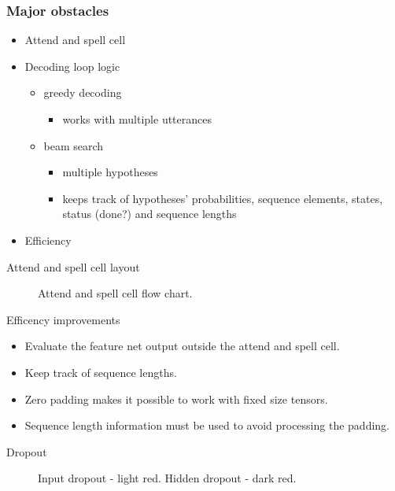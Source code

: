 \documentclass{beamer}
\begin{document}
\begin{frame}[fragile]
\frametitle{Major obstacles}
\begin{itemize}

\item Attend and spell cell
\item Decoding loop logic
	\begin{itemize}
	\item greedy decoding
		\begin{itemize}
		\item works with multiple utterances
		\end{itemize}
	\item beam search
		\begin{itemize}
		\item multiple hypotheses
		\item keeps track of hypotheses' probabilities, sequence elements, states, status (done?) and sequence lengths
		\end{itemize}
	\end{itemize}
\item Efficiency
\end{itemize}
\end{frame}

\begin{frame}{Attend and spell cell layout}
	\begin{figure}
	
	\caption{Attend and spell cell flow chart.}
	\end{figure}
\end{frame}

\begin{frame}{Efficency improvements}
	\begin{itemize}
		\item Evaluate the feature net output outside the attend and spell cell.
		\item Keep track of sequence lengths.
		\item Zero padding makes it possible to work with fixed size tensors.
		\item Sequence length information must be used to avoid processing the padding.
	\end{itemize}
\end{frame}

\begin{frame}{Dropout}
	\begin{figure}
		
		\caption{Input dropout - light red. Hidden dropout - dark red.}
	\end{figure}
\end{frame}
\end{document}
